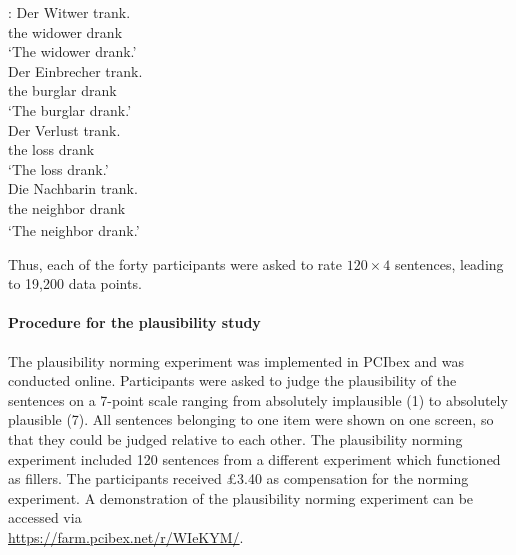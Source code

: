 \documentclass[review,preprint,12pt,authoryear,floatsintext]{elsarticle}
\begin{document}
\begin{exe}  
\ex \label{ex:materials_norming}
    \begin{xlist}   
    :\label{ex:subject} 
    \gll Der Witwer trank. \\ 
    the widower drank\\
    \trans  `The widower drank.'\\  
    \label{ex:animate_dist} 
    \gll Der Einbrecher trank. \\ 
    the burglar drank \\
    \trans `The burglar drank.' \\
   \label{ex:inanimate_dist} 
    \gll Der Verlust trank.  \\ 
    the loss drank\\
    \trans  `The loss drank.'\\  
    \label{ex:intro_noun} 
    \gll Die Nachbarin trank.\\ 
    the\textsubscript{} neighbor\textsubscript{} drank \\
    \trans `The neighbor drank.' \\
    \end{xlist}
\end{exe}

Thus, each of the forty participants were asked to rate $120 \times 4$ sentences, leading to 19,200 data points.

\paragraph{Procedure for the plausibility study}
The plausibility norming experiment was implemented in PCIbex \citep{pcibex} and was conducted online. Participants were asked to judge the plausibility of the sentences on a 7-point scale ranging from absolutely implausible (1) to absolutely plausible (7). All sentences belonging to one item were shown on one screen, so that they could be judged relative to each other. The plausibility norming experiment included 120 sentences from a different experiment which functioned as fillers. The participants received \pounds 3.40 as compensation for the norming experiment. A demonstration of the plausibility norming experiment can be accessed via \\\hyperlink{https://farm.pcibex.net/r/WIeKYM/}{https://farm.pcibex.net/r/WIeKYM/}.
\end{document}
